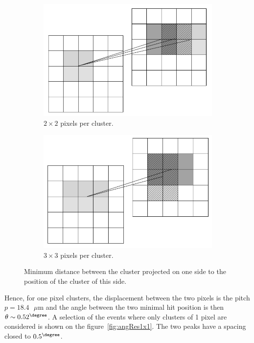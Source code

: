 \begin{figure}[!h]
      \begin{subfigure}[t]{0.45\textwidth}
        \centering
        \includegraphics[width = \textwidth]{Pictures/deformation/cluster_2x2.png}
        \caption{$2 \times 2$ pixels per cluster.}
      \end{subfigure}
      \quad
      \begin{subfigure}[t]{0.45\textwidth}
        \centering
        \includegraphics[width = \textwidth]{Pictures/deformation/cluster_3x3.png}
        \caption{$3 \times 3$ pixels per cluster.}
      \end{subfigure}
      \caption{Minimum distance between the cluster projected on one side to the position of the cluster of this side.}
      \label{fig:clusterSize}
   \end{figure}

   Hence, for one pixel clusters, the displacement between the two pixels is the pitch $p = 18.4 \text{ }\mu\text{m}$ and the angle between the two minimal hit position is then $\theta \sim 0.52^{\degree}$.
   A selection of the events where only clusters of 1 pixel are considered is shown on the figure~\ref{fig:angRes1x1}.
   The two peaks have a spacing closed to $0.5^{\degree}$.


